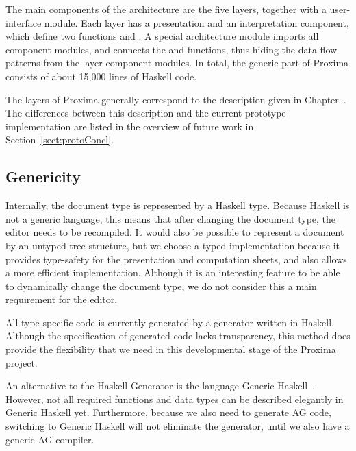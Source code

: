 
The main components of the architecture are the five layers, together with a user-interface module. 
Each layer has a presentation and an interpretation component, which define two functions  and . A special architecture module imports all component modules, and connects the   and  functions, thus hiding the data-flow patterns from the layer component modules. In total, the generic part of Proxima consists of about 15,000 lines of Haskell code. 


%
%

\bc
The layers of Proxima generally correspond to the description given in Chapter~. The differences between this description and the current prototype implementation are listed in the overview of future work in  Section~\ref{sect:protoConcl}. 
\ec

\subsection{Genericity}

Internally, the document type is represented by a Haskell type. Because Haskell is not a generic language, this means that after changing the document type, the editor needs to be recompiled. It would also be possible to represent a document by an untyped tree structure, but we choose a typed implementation because it provides type-safety for the presentation and computation sheets, and also allows a more efficient implementation. Although it is an interesting feature to be able to dynamically change the document type, we do not consider this a main requirement for the editor.

All type-specific code is currently generated by a generator written in Haskell. Although the specification of generated code lacks transparency, this method does provide the flexibility that we need in this developmental stage of the Proxima project. 

An alternative to the Haskell Generator is the language Generic Haskell~\cite{loeh04exploringGH}. However, not all required functions and data types can be described elegantly in Generic Haskell yet. Furthermore, because we also need to generate AG code, switching to Generic Haskell will not eliminate the generator, until we also have a generic AG compiler.


